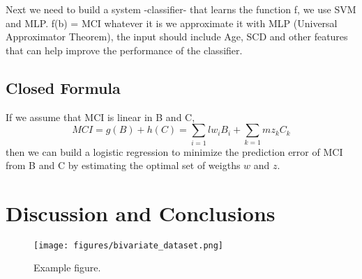 \documentclass[11pt]{article}
\begin{document}


Next we need to build a system -classifier- that learns the function f, we use SVM and MLP.
f(b) = MCI whatever it is we approximate it with MLP (Universal Approximator Theorem), the input should include Age, SCD and other features that can help improve the performance of the classifier.

\subsection*{Closed Formula}
If we assume that MCI is linear in B and C, 
\begin{equation}
MCI = g(B) + h(C) = \sum_{i=1}{l}w_{i}B_{i} + \sum_{k=1}{m}z_{k}C_{k}
\end{equation}
then we can build a logistic regression to minimize the prediction error of MCI from B and C by estimating the optimal set of weigths $w$ and $z$.




\section{Discussion and Conclusions}


\medskip

 

\newpage


\begin{figure}[H]
    \centering
        \texttt{[image: figures/bivariate\_dataset.png]}
    \caption{Example figure.}
    \label{fig:1}
\end{figure}

\end{document}
